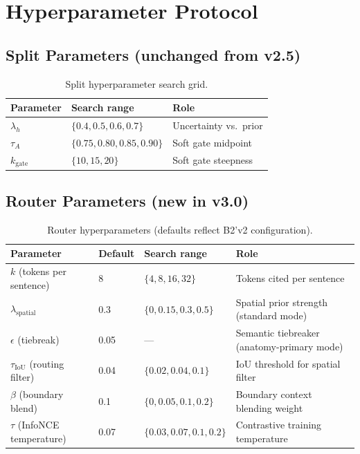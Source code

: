 \documentclass[11pt,a4paper]{article}
\begin{document}
\section{Hyperparameter Protocol}
\label{sec:hyperparams}

\subsection{Split Parameters (unchanged from v2.5)}

\begin{table}[H]
\centering\small
\caption{Split hyperparameter search grid.}
\begin{tabular}{lll}
\toprule
Parameter & Search range & Role \\
\midrule
$\lambda_h$ & $\{0.4, 0.5, 0.6, 0.7\}$ & Uncertainty vs.\ prior \\
$\tau_A$ & $\{0.75, 0.80, 0.85, 0.90\}$ & Soft gate midpoint \\
$k_{\mathrm{gate}}$ & $\{10, 15, 20\}$ & Soft gate steepness \\
\bottomrule
\end{tabular}
\end{table}

\subsection{Router Parameters (new in v3.0)}

\begin{table}[H]
\centering\small
\caption{Router hyperparameters (defaults reflect B2'v2 configuration).}
\begin{tabular}{llll}
\toprule
Parameter & Default & Search range & Role \\
\midrule
$k$ (tokens per sentence) & 8 & $\{4, 8, 16, 32\}$ & Tokens cited per sentence \\
$\lambda_{\mathrm{spatial}}$ & 0.3 & $\{0, 0.15, 0.3, 0.5\}$ & Spatial prior strength (standard mode) \\
$\epsilon$ (tiebreak) & 0.05 & --- & Semantic tiebreaker (anatomy-primary mode) \\
$\tau_{\mathrm{IoU}}$ (routing filter) & 0.04 & $\{0.02, 0.04, 0.1\}$ & IoU threshold for spatial filter \\
$\beta$ (boundary blend) & 0.1 & $\{0, 0.05, 0.1, 0.2\}$ & Boundary context blending weight \\
$\tau$ (InfoNCE temperature) & 0.07 & $\{0.03, 0.07, 0.1, 0.2\}$ & Contrastive training temperature \\
\bottomrule
\end{tabular}
\end{table}
\end{document}
